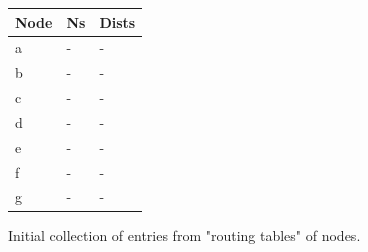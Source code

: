 \documentclass[12pt, oneandhalf, chaparabic, sees, ms]{metu}
\begin{document}
\begin{center}
 \begin{figure}[!htp]
  \begin{center}
   \noindent \begin{minipage}{.7\textwidth}
   \end{minipage}%
   \hfill
    \noindent \begin{minipage}{0.3\textwidth}
    \begin{tabular}{ | l | l | l | }
    \hline
    \rowcolor{lightgray}
    Node & Ns & Dists \\ \hline \hline
    a    & -  & -     \\ \hline
    b    & -  & -     \\ \hline
    c    & -  & -     \\ \hline
    d    & -  & -     \\ \hline
    e    & -  & -     \\ \hline
    f    & -  & -     \\ \hline
    g    & -  & -     \\
    \hline
    \end{tabular}
   \end{minipage}
   
   \end{center}
    \caption{Initial collection of entries from "routing tables" of nodes.}
    \label{fig:lagoon-graph1}
  \end{figure}
\end{center}
 
\end{document}
